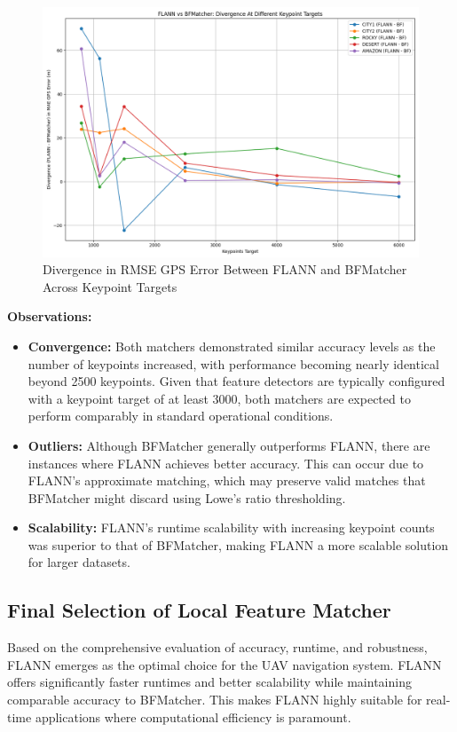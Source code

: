 \begin{figure}[H]
    \centering
    \includegraphics[width=\textwidth]{./Graphs/Divergence_BF_FLANN_KPS.png}
    \caption{Divergence in RMSE GPS Error Between FLANN and BFMatcher Across Keypoint Targets}
    \label{fig:divergence_plot}
\end{figure}

\textbf{Observations:}
\begin{itemize}
    \item \textbf{Convergence:} Both matchers demonstrated similar accuracy levels as the number of keypoints increased, with performance becoming nearly identical beyond 2500 keypoints. Given that feature detectors are typically configured with a keypoint target of at least 3000, both matchers are expected to perform comparably in standard operational conditions.
    \item \textbf{Outliers:} Although BFMatcher generally outperforms FLANN, there are instances where FLANN achieves better accuracy. This can occur due to FLANN’s approximate matching, which may preserve valid matches that BFMatcher might discard using Lowe’s ratio thresholding.
    \item \textbf{Scalability:} FLANN's runtime scalability with increasing keypoint counts was superior to that of BFMatcher, making FLANN a more scalable solution for larger datasets.
\end{itemize}

\subsection{Final Selection of Local Feature Matcher}

Based on the comprehensive evaluation of accuracy, runtime, and robustness, FLANN emerges as the optimal choice for the UAV navigation system. FLANN offers significantly faster runtimes and better scalability while maintaining comparable accuracy to BFMatcher. This makes FLANN highly suitable for real-time applications where computational efficiency is paramount.

